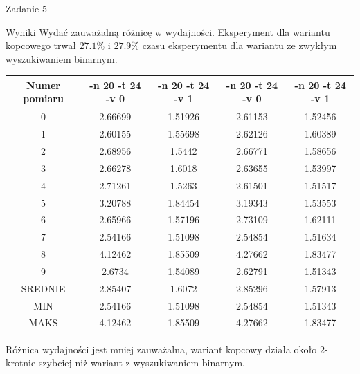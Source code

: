 \documentclass[11pt,wide]{mwart}
\begin{document}
\begin{section}{Zadanie 5}
\begin{subsection}{Wyniki}
Wydać zauważalną różnicę w wydajności. Eksperyment dla wariantu kopcowego trwał \(27.1\%\) i \(27.9\%\) czasu eksperymentu dla wariantu ze zwykłym wyszukiwaniem binarnym. \\


\begin{center}
\begin{tabular}{|c|c|c|c|c|}
\hline
Numer pomiaru & -n 20 -t 24 -v 0 & -n 20 -t 24 -v 1 & -n 20 -t 24 -v 0 & -n 20 -t 24 -v 1\\
\hline
0 & 2.66699 & 1.51926 & 2.61153 & 1.52456\\
\hline
1 & 2.60155 & 1.55698 & 2.62126 & 1.60389\\
\hline
2 & 2.68956 & 1.5442 & 2.66771 & 1.58656\\
\hline
3 & 2.66278 & 1.6018 & 2.63655 & 1.53997\\
\hline
4 & 2.71261 & 1.5263 & 2.61501 & 1.51517\\
\hline
5 & 3.20788 & 1.84454 & 3.19343 & 1.53553\\
\hline
6 & 2.65966 & 1.57196 & 2.73109 & 1.62111\\
\hline
7 & 2.54166 & 1.51098 & 2.54854 & 1.51634\\
\hline
8 & 4.12462 & 1.85509 & 4.27662 & 1.83477\\
\hline
9 & 2.6734 & 1.54089 & 2.62791 & 1.51343\\
\hline
SREDNIE & 2.85407 & 1.6072 & 2.85296 & 1.57913\\
\hline
MIN & 2.54166 & 1.51098 & 2.54854 & 1.51343\\
\hline
MAKS & 4.12462 & 1.85509 & 4.27662 & 1.83477\\
\hline
\end{tabular}
\end{center}

Różnica wydajności jest mniej zauważalna, wariant kopcowy działa około 2-krotnie szybciej niż wariant z wyszukiwaniem binarnym.




\end{subsection}
\end{section}
\end{document}
